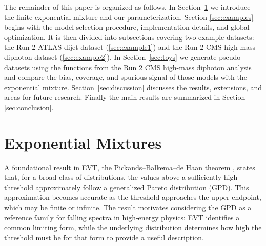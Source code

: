 \documentclass[a4paper,11pt]{article}
\begin{document}
The remainder of this paper is organized as follows. In Section~\ref{sec:emm} we introduce the 
finite exponential mixture and our parameterization. Section \ref{sec:examples} begins with the model selection procedure, implementation details, and global optimization. It is then divided into subsections covering two example datasets: the Run 2 ATLAS dijet dataset (\ref{sec:example1}) and the Run 2 CMS high-mass diphoton dataset (\ref{sec:example2}). In 
Section~\ref{sec:toys} we generate pseudo-datasets using the functions from the Run 2 CMS high-mass diphoton analysis and compare the bias, coverage, and spurious signal of those models 
with the exponential mixture. Section~\ref{sec:discussion} discusses the results, extensions, and areas for future research. Finally the main results are summarized in Section \ref{sec:conclusion}.

\section{Exponential Mixtures}
\label{sec:emm}

A foundational result in EVT, the Pickands–Balkema–de Haan theorem \cite{Picklands_1975, Balkema_Haan_1974}, states that, for a broad class of distributions, the values above a sufficiently high threshold approximately follow a generalized Pareto distribution (GPD). This approximation becomes accurate as the threshold approaches the upper endpoint, which may be finite or infinite. The result motivates considering the GPD as a reference family for falling spectra in high-energy physics: EVT identifies a common limiting form, while the underlying distribution determines how high the threshold must be for that form to provide a useful description. 
\end{document}

